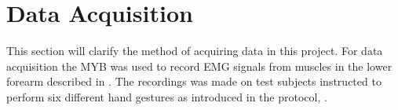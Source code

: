 \section{Data Acquisition} \label{sec:dataAcquisition}

This section will clarify the method of acquiring data in this project. For data acquisition the MYB was used to record EMG signals from muscles in the lower forearm described in . The recordings was made on test subjects instructed to perform six different hand gestures as introduced in the protocol, . 



